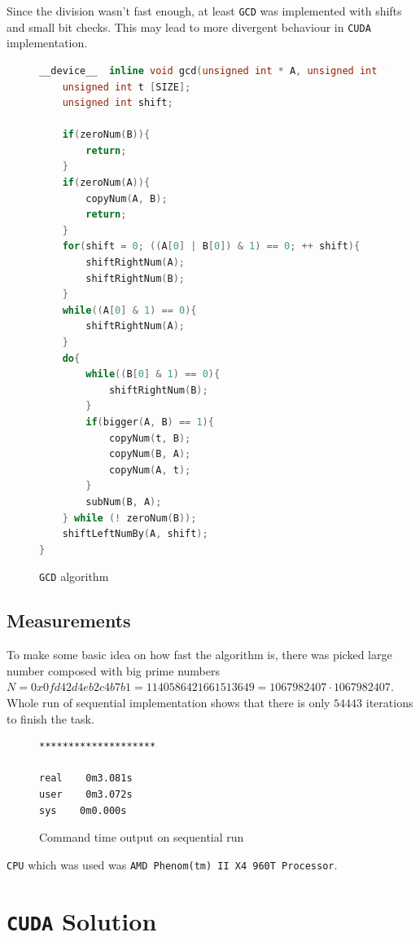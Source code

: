 \documentclass[a4paper]{article}
\begin{document}
Since the division wasn't fast enough, at least \texttt{GCD} was implemented with shifts and small bit checks. This may lead to more divergent behaviour in \texttt{CUDA} implementation.

\begin{figure}[H]
    \centering
    \begin{lstlisting}[language=c,basicstyle=\small]
__device__  inline void gcd(unsigned int * A, unsigned int * B){
    unsigned int t [SIZE];
    unsigned int shift;

    if(zeroNum(B)){
        return;
    }
    if(zeroNum(A)){
        copyNum(A, B);
        return;
    }
    for(shift = 0; ((A[0] | B[0]) & 1) == 0; ++ shift){
        shiftRightNum(A);
        shiftRightNum(B);
    }
    while((A[0] & 1) == 0){
        shiftRightNum(A);
    }
    do{
        while((B[0] & 1) == 0){
            shiftRightNum(B);
        }
        if(bigger(A, B) == 1){
            copyNum(t, B);
            copyNum(B, A);
            copyNum(A, t);
        }
        subNum(B, A);
    } while (! zeroNum(B));
    shiftLeftNumBy(A, shift);
}
    \end{lstlisting}
    \caption{\texttt{GCD} algorithm}
    \label{gcd}
\end{figure}

\subsection{Measurements}

To make some basic idea on how fast the algorithm is, there was picked large number composed with big prime numbers $N = 0x0fd42d4eb2c4b7b1 = 1140586421661513649 = 1067982407 \cdot 1067982407$. Whole run of sequential implementation shows that there is only $54443$ iterations to finish the task.


\begin{figure}[H]
    \centering
    \begin{lstlisting}[language=sh,basicstyle=\small]
********************

real    0m3.081s
user    0m3.072s
sys    0m0.000s
    \end{lstlisting}
    \caption{Command time output on sequential run}
    \label{tmsq}
\end{figure}

\texttt{CPU} which was used was \texttt{AMD Phenom(tm) II X4 960T Processor}.

\section{\texttt{CUDA} Solution}
\end{document}

